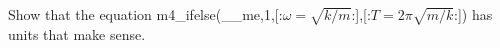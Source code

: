 Show that the equation m4_ifelse(__me,1,[:$\omega=\sqrt{k/m}$:],[:$T=2\pi\sqrt{m/k}$:]) has units that make sense.
